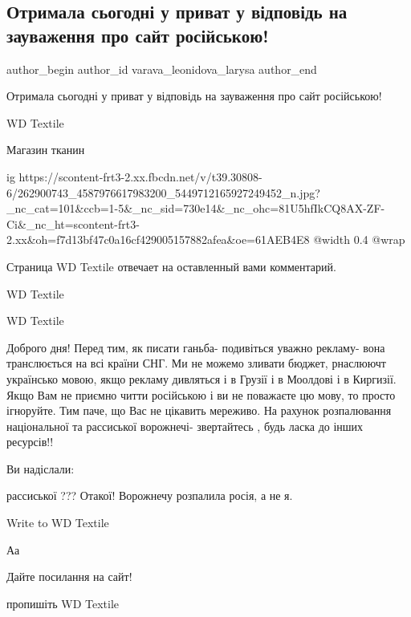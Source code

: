  
 
 
 
 
 
\subsection{Отримала сьогодні у приват у відповідь на зауваження про сайт російською!}
\label{sec:30_11_2021.fb.varava_leonidova_larysa.1.mova_jazyk}
 
\ifcmt
 author_begin
   author_id varava_leonidova_larysa
 author_end
\fi

Отримала сьогодні у приват у відповідь на зауваження про сайт російською!

WD Textile

Магазин тканин

\ifcmt
  ig https://scontent-frt3-2.xx.fbcdn.net/v/t39.30808-6/262900743_4587976617983200_5449712165927249452_n.jpg?_nc_cat=101&ccb=1-5&_nc_sid=730e14&_nc_ohc=81U5hfIkCQ8AX-ZF-Ci&_nc_ht=scontent-frt3-2.xx&oh=f7d13bf47c0a16cf429005157882afea&oe=61AEB4E8
  @width 0.4
  @wrap 
\fi

Страница WD Textile отвечает на оставленный вами комментарий.

WD Textile

WD Textile

Доброго дня! Перед тим, як писати ганьба- подивіться уважно рекламу- вона
транслюється на всі країни СНГ. Ми не можемо зливати бюджет, рнаслюючт
українсько мовою, якщо рекламу дивляться і в Грузії і в Моолдові і в Киргизії.
Якщо Вам не приємно читти російською і ви не поважаєте цю мову, то просто
ігноруйте. Тим паче, що Вас не цікавить мереживо. На рахунок розпалювання
національної та рассиської ворожнечі- звертайтесь , будь ласка до інших
ресурсів!!

Ви надіслали:

рассиської ??? Отакої! Ворожнечу розпалила росія, а не я.

Write to WD Textile

Аа

\begin{itemize} %
Дайте посилання на сайт!

пропишіть WD Textile
\end{itemize} %

